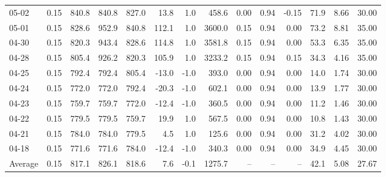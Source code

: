 \begin{threeparttable}
{\begin{tabular}{lrrrrrrrrrrrrr}
  05-02 &     0.15 & 840.8 &  840.8 & 827.0 &       13.8 &                      1.0 &               458.6 &       0.00 &      0.94 &          -0.15 &             71.9 &            8.66 &                  30.00 \\
  05-01 &     0.15 & 828.6 &  952.9 & 840.8 &      112.1 &                      1.0 &              3600.0 &       0.15 &      0.94 &           0.00 &             73.2 &            8.81 &                  35.00 \\
  04-30 &     0.15 & 820.3 &  943.4 & 828.6 &      114.8 &                      1.0 &              3581.8 &       0.15 &      0.94 &           0.00 &             53.3 &            6.35 &                  35.00 \\
  04-28 &     0.15 & 805.4 &  926.2 & 820.3 &      105.9 &                      1.0 &              3233.2 &       0.15 &      0.94 &           0.15 &             34.3 &            4.16 &                  35.00 \\
  04-25 &     0.15 & 792.4 &  792.4 & 805.4 &      -13.0 &                     -1.0 &               393.0 &       0.00 &      0.94 &           0.00 &             14.0 &            1.74 &                  30.00 \\
  04-24 &     0.15 & 772.0 &  772.0 & 792.4 &      -20.3 &                     -1.0 &               602.1 &       0.00 &      0.94 &           0.00 &             13.9 &            1.77 &                  30.00 \\
  04-23 &     0.15 & 759.7 &  759.7 & 772.0 &      -12.4 &                     -1.0 &               360.5 &       0.00 &      0.94 &           0.00 &             11.2 &            1.46 &                  30.00 \\
  04-22 &     0.15 & 779.5 &  779.5 & 759.7 &       19.9 &                      1.0 &               567.5 &       0.00 &      0.94 &           0.00 &             10.8 &            1.43 &                  30.00 \\
  04-21 &     0.15 & 784.0 &  784.0 & 779.5 &        4.5 &                      1.0 &               125.6 &       0.00 &      0.94 &           0.00 &             31.2 &            4.02 &                  30.00 \\
  04-18 &     0.15 & 771.6 &  771.6 & 784.0 &      -12.4 &                     -1.0 &               340.3 &       0.00 &      0.94 &           0.00 &             34.9 &            4.45 &                  30.00 \\
Average &     0.15 & 817.1 &  826.1 & 818.6 &        7.6 &                     -0.1 &              1275.7 &         -- &        -- &             -- &             42.1 &            5.08 &                  27.67 \\

\end{tabular}}
\end{threeparttable}
